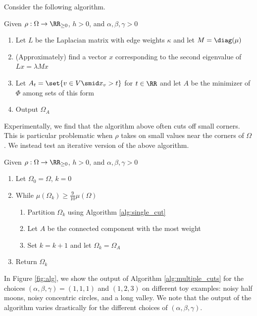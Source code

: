 Consider the following algorithm.
\begin{algorithm}
\label{alg:single_cut}
	Given $\rho:\Omega\to\RR_{\geq 0}$,  $h>0$, and $\alpha,\beta,\gamma>0$
	\begin{enumerate}
	 	\item Let $L$ be the Laplacian matrix with edge weights $\kappa$ and let $M=\diag(\mu)$
	 	\item (Approximately) find a vector $x$ corresponding to the second eigenvalue of $Lx = \lambda Mx$
	 	\item Let $A_t = \set{v\in V \smid x_v >t}$ for $t\in\RR$ and let $A$ be the minimizer of $\Phi$ among sets of this form 
	 	\item Output $\Omega_A$
	 \end{enumerate} 
\end{algorithm}

Experimentally, we find that the algorithm above often cuts off small corners. This is particular problematic when $\rho$ takes on small values near the corners of $\Omega$. We instead test an iterative version of the above algorithm.

\begin{algorithm}
\label{alg:multiple_cuts}
	Given $\rho:\Omega\to\RR_{\geq 0}$, $h>0$, and $\alpha,\beta,\gamma>0$
	\begin{enumerate}
		\item Let $\Omega_0 = \Omega$, $k=0$
		\item While $\mu(\Omega_k)\geq \frac{9}{10} \mu(\Omega)$
		\begin{enumerate}
			\item Partition $\Omega_k$ using Algorithm \ref{alg:single_cut}
			\item Let $A$ be the connected component with the most weight
			\item Set $k = k+1$ and let $\Omega_k = \Omega_A$
		\end{enumerate}
		\item Return $\Omega_k$
	\end{enumerate}
\end{algorithm}

In Figure \ref{fig:alg}, we show the output of Algorithm \ref{alg:multiple_cuts} for the choices $(\alpha,\beta,\gamma)=(1,1,1)$ and $(1,2,3)$ on different toy examples: noisy half moons, noisy concentric circles, and a long valley. We note that the output of the algorithm varies drastically for the different choices of $(\alpha,\beta,\gamma)$.

